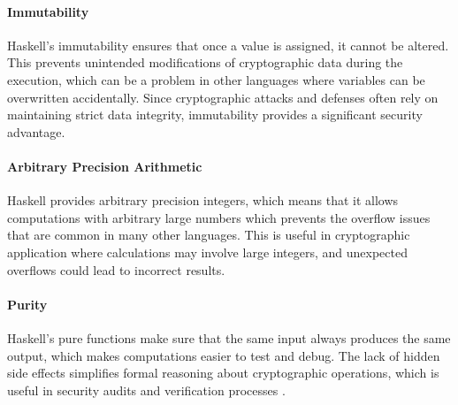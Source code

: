 \paragraph{Immutability}
Haskell's immutability ensures that once a value is assigned, it cannot be altered. 
This prevents unintended modifications of cryptographic data during the execution, 
which can be a problem in other languages where variables can be overwritten accidentally. 
Since cryptographic attacks and defenses often rely on maintaining strict data integrity, 
immutability provides a significant security advantage.

\paragraph{Arbitrary Precision Arithmetic}
Haskell provides arbitrary precision integers, 
which means that it allows computations with arbitrary large numbers which prevents the overflow issues that are common in many other languages. 
This is useful in cryptographic application where calculations may involve large integers, and unexpected overflows could lead to incorrect results.

\paragraph{Purity}
Haskell's pure functions make sure that the same input always produces the same output, 
which makes computations easier to test and debug. The lack of hidden side effects simplifies formal reasoning about cryptographic operations, 
which is useful in security audits and verification processes \cite{Hughes1989}.

